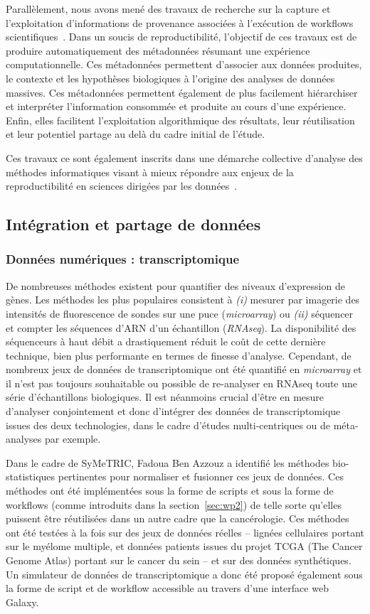 \documentclass[a4paper,10pt]{article}
\theoremstyle{definition}
\begin{document}
Parallèlement, nous avons mené des travaux de recherche sur la capture et l'exploitation d'informations de provenance associées à l'exécution de workflows scientifiques~\cite{tapp16, eswc17}. Dans un soucis de reproductibilité, l'objectif de ces travaux est de produire automatiquement des métadonnées résumant une expérience computationnelle. Ces métadonnées permettent d'associer aux données produites, le contexte et les hypothèses biologiques à l'origine des analyses de données massives. Ces métadonnées permettent également de plus facilement hiérarchiser et interpréter l'information consommée et produite au cours d'une expérience. Enfin, elles facilitent l'exploitation algorithmique des résultats, leur réutilisation et leur potentiel partage au delà du cadre initial de l'étude. 

Ces travaux ce sont également inscrits dans une démarche collective d'analyse des méthodes informatiques visant à mieux répondre aux enjeux de la reproductibilité en sciences dirigées par les données~\cite{fgcs-repro-17}. 

\subsection{Intégration et partage de données}

\subsubsection{Données numériques : transcriptomique}
De nombreuses méthodes existent pour quantifier des niveaux d'expression de gènes. Les méthodes les plus populaires consistent à {\em (i)} mesurer par imagerie des intensités de fluorescence de sondes sur une puce ({\em microarray}) ou {\em (ii)} séquencer et compter les séquences d'ARN d'un échantillon ({\em RNAseq}). La disponibilité des séquenceurs à haut débit a drastiquement réduit le coût de cette dernière technique, bien plus performante en termes de finesse d'analyse. Cependant, de nombreux jeux de données de transcriptomique ont été quantifié en {\em microarray} et il n'est pas toujours souhaitable ou possible de re-analyser en RNAseq toute une série d'échantillons biologiques. Il est néanmoins crucial d'être en mesure d'analyser conjointement et donc d'intégrer des données de transcriptomique issues des deux technologies, dans le cadre d'études multi-centriques ou de méta-analyses par exemple. 

Dans le cadre de SyMeTRIC, Fadoua Ben Azzouz a identifié les méthodes bio-statistiques pertinentes pour normaliser et fusionner ces jeux de données. Ces méthodes ont été implémentées sous la forme de scripts et sous la forme de workflows (comme introduits dans la section~\ref{sec:wp2}) de telle sorte qu'elles puissent être réutilisées dans un autre cadre que la cancérologie. Ces méthodes ont été testées à la fois sur des jeux de données réelles -- lignées cellulaires portant sur le myélome multiple, et données patients issues du projet TCGA (The Cancer Genome Atlas) portant sur le cancer du sein -- et sur des données synthétiques. Un simulateur de données de transcriptomique a donc été proposé également sous la forme de script et de workflow accessible au travers d'une interface web Galaxy. 
 
\end{document}
